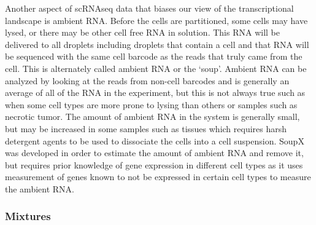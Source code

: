\par{
Another aspect of scRNAseq data that biases our view of the transcriptional landscape is ambient RNA. Before the cells are partitioned, some cells may have lysed, or there may be other cell free RNA in solution. This RNA will be delivered to all droplets including droplets that contain a cell and that RNA will be sequenced with the same cell barcode as the reads that truly came from the cell. This is alternately called ambient RNA or the `soup'. Ambient RNA can be analyzed by looking at the reads from non-cell barcodes and is generally an average of all of the RNA in the experiment, but this is not always true such as when some cell types are more prone to lysing than others or samples such as necrotic tumor. The amount of ambient RNA in the system is generally small, but may be increased in some samples such as tissues which requires harsh detergent agents to be used to dissociate the cells into a cell suspension. SoupX was developed in order to estimate the amount of ambient RNA and remove it\cite{soupx}, but requires prior knowledge of gene expression in different cell types as it uses measurement of genes known to not be expressed in certain cell types to measure the ambient RNA. 
}

\subsubsection{Mixtures}


